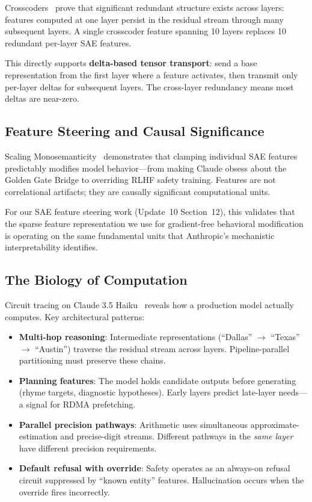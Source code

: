 \documentclass[11pt,letterpaper]{article}
\begin{document}
Crosscoders~\cite{anthropic2024crosscoders} prove that significant redundant structure exists across layers: features computed at one layer persist in the residual stream through many subsequent layers. A single crosscoder feature spanning 10 layers replaces 10 redundant per-layer SAE features.

This directly supports \textbf{delta-based tensor transport}: send a base representation from the first layer where a feature activates, then transmit only per-layer deltas for subsequent layers. The cross-layer redundancy means most deltas are near-zero.

\subsection{Feature Steering and Causal Significance}

Scaling Monosemanticity~\cite{templeton2024scaling} demonstrates that clamping individual SAE features predictably modifies model behavior---from making Claude obsess about the Golden Gate Bridge to overriding RLHF safety training. Features are not correlational artifacts; they are causally significant computational units.

For our SAE feature steering work (Update~10 Section~12), this validates that the sparse feature representation we use for gradient-free behavioral modification is operating on the same fundamental units that Anthropic's mechanistic interpretability identifies.

\subsection{The Biology of Computation}

Circuit tracing on Claude 3.5 Haiku~\cite{lindsey2025biology} reveals how a production model actually computes. Key architectural patterns:

\begin{itemize}
    \item \textbf{Multi-hop reasoning}: Intermediate representations (``Dallas'' $\to$ ``Texas'' $\to$ ``Austin'') traverse the residual stream across layers. Pipeline-parallel partitioning must preserve these chains.
    \item \textbf{Planning features}: The model holds candidate outputs before generating (rhyme targets, diagnostic hypotheses). Early layers predict late-layer needs---a signal for RDMA prefetching.
    \item \textbf{Parallel precision pathways}: Arithmetic uses simultaneous approximate-estimation and precise-digit streams. Different pathways in the \emph{same layer} have different precision requirements.
    \item \textbf{Default refusal with override}: Safety operates as an always-on refusal circuit suppressed by ``known entity'' features. Hallucination occurs when the override fires incorrectly.
\end{itemize}
\end{document}
